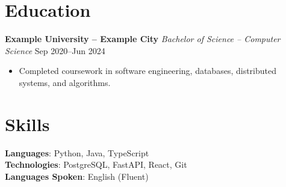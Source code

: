 \documentclass[a4paper,10pt]{article}
\begin{document}
\begin{small}
\section*{Education}
\textbf{Example University -- Example City}
\emph{Bachelor of Science -- Computer Science} \hfill Sep 2020--Jun 2024
\begin{itemize}[leftmargin=*]
\item Completed coursework in software engineering, databases, distributed systems, and algorithms.
\end{itemize}

\section*{Skills}

\textbf{Languages}: Python, Java, TypeScript \\
\textbf{Technologies}: PostgreSQL, FastAPI, React, Git \\
\textbf{Languages Spoken}: English (Fluent)

\end{small}
\end{document}
